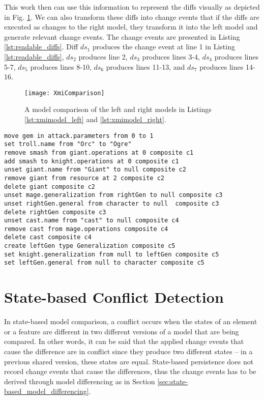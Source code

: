 This work then can use this information to represent the diffs visually as depicted in Fig. \ref{fig:xmi_comparison}. We can also transform these diffs into change events that if the diffs are executed as changes to the right model, they transform it into the left model and generate relevant change events. The change events are presented in Listing \ref{lst:readable_diffs}. Diff $ds_{1}$ produces the change event at line 1 in Listing \ref{lst:readable_diffs}, $ds_{2}$ produces line 2, $ds_{3}$ produces lines 3-4, $ds_{4}$ produces lines 5-7, $ds_{5}$ produces lines 8-10, $ds_{6}$ produces lines 11-13, and $ds_{7}$ produces lines 14-16.

\begin{figure}[ht]
  \texttt{[image: XmiComparison]}
  \caption{A model comparison of the left and right models in Listings \ref{lst:xmimodel_left} and \ref{lst:xmimodel_right}.}
  \label{fig:xmi_comparison}
\end{figure}

\vspace{-20pt}
\begin{lstlisting}[firstnumber=1,style=eol,caption={The identified diffs presented as change events.},label=lst:readable_diffs]
move gem in attack.parameters from 0 to 1
set troll.name from "Orc" to "Ogre"
remove smash from giant.operations at 0 composite c1
add smash to knight.operations at 0 composite c1
unset giant.name from "Giant" to null composite c2
remove giant from resource at 2 composite c2
delete giant composite c2
unset mage.generalization from rightGen to null composite c3
unset rightGen.general from character to null  composite c3
delete rightGen composite c3
unset cast.name from "cast" to null composite c4
remove cast from mage.operations composite c4
delete cast composite c4
create leftGen type Generalization composite c5
set knight.generalization from null to leftGen composite c5
set leftGen.general from null to character composite c5
\end{lstlisting}

\section{State-based Conflict Detection}
\label{sec:emfcompare_conflict_detection}
In state-based model comparison, a conflict occurs when the states of an element or a feature are different in two different versions of a model that are being compared. In other words, it can be said that the applied change events that cause the difference are in conflict since they produce two different states -- in a previous shared version, these states are equal. State-based persistence does not record change events that cause the differences, thus the change events has to be derived through model differencing as in Section \ref{sec:state-based_model_differencing}. 

